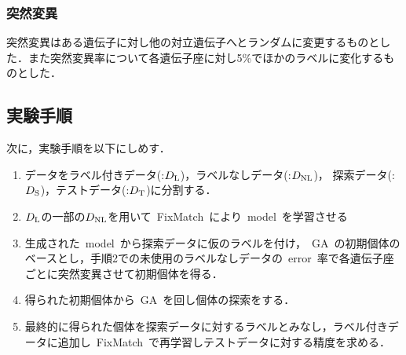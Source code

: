 \documentclass[twocolumn]{jarticle}     %
\begin{document}
\subsubsection{突然変異}
突然変異はある遺伝子に対し他の対立遺伝子へとランダムに変更するものとした．また突然変異率について各遺伝子座に対し5\%でほかのラベルに変化するものとした．

\subsection{実験手順}
次に，実験手順を以下にしめす．
\begin{enumerate}
	\item データをラベル付きデータ(:$D_{\rm L}$)，ラベルなしデータ(:$D_{\rm {NL}}$)， 探索データ(:$D_{\rm S}$)，テストデータ(:$D_{\rm T}$)に分割する．
	\item $D_{\rm L}$の一部の$D_{\rm {NL}}$を用いて\ FixMatch\ により\ model\ を学習させる
	\item 生成された\ model\ から探索データに仮のラベルを付け，\ GA\ の初期個体のベースとし，手順2での未使用のラベルなしデータの\ error\ 率で各遺伝子座ごとに突然変異させて初期個体を得る．
	\item 得られた初期個体から\ GA\ を回し個体の探索をする．
	\item 最終的に得られた個体を探索データに対するラベルとみなし，ラベル付きデータに追加し\ FixMatch\ で再学習しテストデータに対する精度を求める．
\end{enumerate}
\end{document}
